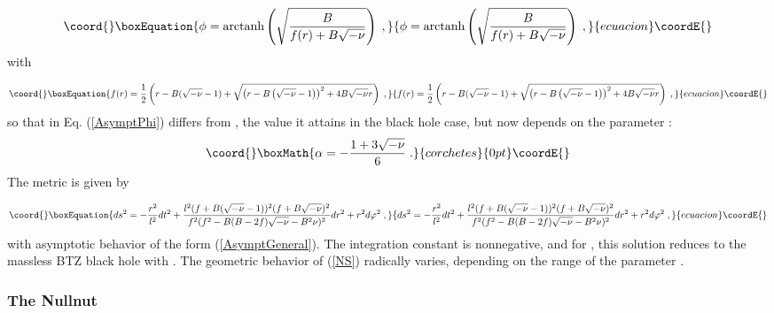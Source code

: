 \documentclass[a4paper,12pt]{article}
\begin{document}
\begin{equation}\coord{}\boxEquation{
\phi =\textrm{arctanh}\left( \sqrt{\frac{B}{f(r)+B\sqrt{-\nu }}}\right) \;,
\label{PhiNS}
}{
\phi =\textrm{arctanh}\left( \sqrt{\frac{B}{f(r)+B\sqrt{-\nu }}}\right) \;,
}{ecuacion}\coordE{}\end{equation}
with

\begin{equation}\coord{}\boxEquation{
f(r)=\frac{1}{2}\left( r-B(\sqrt{-\nu }-1)+\sqrt{\left( r-B\left( \sqrt{-\nu 
}-1\right) \right) ^{2}+4B\sqrt{-\nu }r}\right) \;,  \label{f}
}{
f(r)=\frac{1}{2}\left( r-B(\sqrt{-\nu }-1)+\sqrt{\left( r-B\left( \sqrt{-\nu 
}-1\right) \right) ^{2}+4B\sqrt{-\nu }r}\right) \;,  }{ecuacion}\coordE{}\end{equation}
so that \myHighlight{$\alpha $}\coordHE{} in Eq. (\ref{AsymptPhi}) differs from \coordHE{},  
the value it attains in the black hole case, but now depends on the parameter \myHighlight{$\nu $}\coordHE{}:
\[\coord{}\boxMath{
\alpha =-\frac{1+3\sqrt{-\nu }}{6}\;.
}{corchetes}{0pt}\coordE{}\]
The metric is given by

\begin{equation}\coord{}\boxEquation{
ds^{2}=-\frac{r^{2}}{l^{2}}dt^{2}+\frac{l^{2}(f+B(\sqrt{-\nu }-1))^{2}(f+B
\sqrt{-\nu })^{2}}{f^{2}(f^{2}-B(B-2f)\sqrt{-\nu }-B^{2}\nu )^{2}}
dr^{2}+r^{2}d\varphi ^{2}\;,  \label{NS}
}{
ds^{2}=-\frac{r^{2}}{l^{2}}dt^{2}+\frac{l^{2}(f+B(\sqrt{-\nu }-1))^{2}(f+B
\sqrt{-\nu })^{2}}{f^{2}(f^{2}-B(B-2f)\sqrt{-\nu }-B^{2}\nu )^{2}}
dr^{2}+r^{2}d\varphi ^{2}\;,  }{ecuacion}\coordE{}\end{equation}
with asymptotic behavior of the form (\ref{AsymptGeneral}). The
integration constant \coordHE{} is nonnegative, and for \coordHE{}, this solution
reduces to the massless BTZ black hole with \coordHE{}. The geometric
behavior of (\ref{NS}) radically varies, depending on the range of the
parameter \myHighlight{$\nu $}\coordHE{}.

\subsubsection{The Nullnut} \label{nullnutsec}
\end{document}
